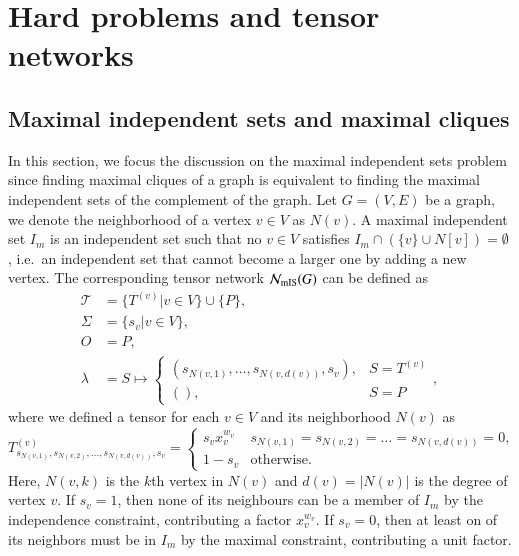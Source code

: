 \documentclass[review, onefignum, onetabnum]{siamart190516}
\begin{document}
\section{Hard problems and tensor networks}\label{sec:otherproblems}
\subsection{Maximal independent sets and maximal cliques}\label{sec:maximal}
In this section, we focus the discussion on the maximal independent sets problem since finding maximal cliques of a graph is equivalent to finding the maximal independent sets of the complement of the graph.
Let $G=(V,E)$ be a graph, we denote the neighborhood of a vertex $v\in V$ as $N(v)$.
A maximal independent set $I_m$ is an independent set such that no $v \in V$ satisfies $I_m \cap (\{v\} \cup N[v])  = \emptyset$, i.e.\ an independent set that cannot become a larger one by adding a new vertex.
The corresponding tensor network $\mathcal{N}_{\rm mIS}(G)$ can be defined as
\begin{equation}\label{eq:maxistensornetwork}
\begin{split}
    \mathcal{T} &= \{T^{(v)} | v\in V\} \cup \{P\},\\
    \Sigma &= \{s_v | v \in V\},\\
    O &= P,\\
    \lambda &= S \mapsto \begin{cases}
                    (s_{N(v,1)}, \ldots, s_{N(v,d(v))}, s_v), & S = T^{(v)}\\
                    (), & S = P
                    \end{cases},
\end{split}
\end{equation}
where we defined a tensor for each $v \in V$ and its neighborhood $N(v)$ as
\begin{equation}\label{eq:maximal}
    T^{(v)}_{s_{N(v, 1)},s_{N(v, 2)},\ldots,s_{N(v, d(v))},s_v} = \begin{cases}
        s_vx_v^{w_v} & s_{N(v, 1)}=s_{N(v, 2)}=\ldots=s_{N(v, d(v))}=0,\\
        1-s_v& \text{otherwise}.
    \end{cases}
\end{equation}
Here, $N(v, k)$ is the $k$th vertex in $N(v)$ and $d(v) = |N(v)|$ is the degree of vertex $v$.
If $s_v = 1$, then none of its neighbours can be a member of $I_{m}$ by the independence constraint, contributing a factor $x_v^{w_v}$.
If $s_v = 0$, then at least on of its neighbors must be in $I_{m}$ by the maximal constraint, contributing a unit factor.
\end{document}
